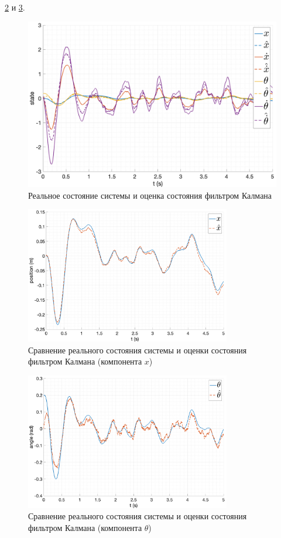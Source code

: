 \ref{fig:lqgn_filter_cmp_x1} и \ref{fig:lqgn_filter_cmp_ang2}.
\begin{figure}[ht!]
    \centering
    \includegraphics[width=\textwidth]{media/plots/LQGn/observer_cmp_1.png}
    \caption{Реальное состояние системы и оценка состояния фильтром Калмана}
    \label{fig:lqgn_filter_cmp}
\end{figure}
\begin{figure}[ht!]
    \centering
    \includegraphics[width=0.8\textwidth]{media/plots/LQGn/observer_x_cmp_1.png}
    \caption{Сравнение реального состояния системы и оценки состояния фильтром Калмана (компонента $x$)}
    \label{fig:lqgn_filter_cmp_x1} 
\end{figure}
\begin{figure}[ht!]
    \centering
    \includegraphics[width=0.8\textwidth]{media/plots/LQGn/observer_theta_cmp_1.png}
    \caption{Сравнение реального состояния системы и оценки состояния фильтром Калмана (компонента $\theta$)}
    \label{fig:lqgn_filter_cmp_ang2}
\end{figure}

